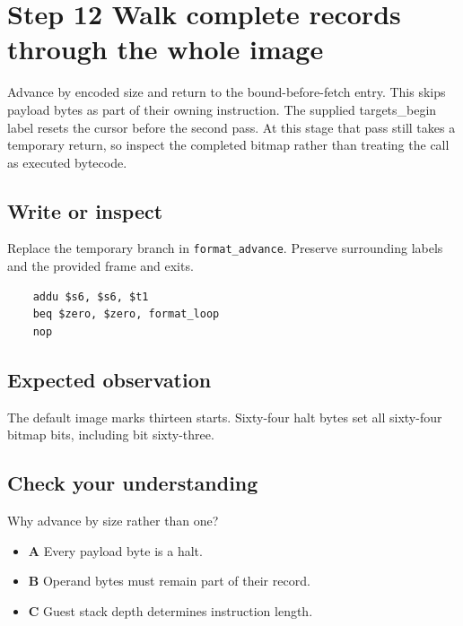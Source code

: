 \section{Step 12 Walk complete records through the whole image}\label{vm-s12}

Advance by encoded size and return to the bound-before-fetch entry. This skips payload bytes as part of their owning instruction. The supplied targets\_begin label resets the cursor before the second pass. At this stage that pass still takes a temporary return, so inspect the completed bitmap rather than treating the call as executed bytecode.

\subsection{Write or inspect}
Replace the temporary branch in \texttt{format\_advance}. Preserve surrounding labels and the provided frame and exits.

\begin{verbatim}
    addu $s6, $s6, $t1
    beq $zero, $zero, format_loop
    nop
\end{verbatim}
\subsection{Expected observation}
The default image marks thirteen starts. Sixty-four halt bytes set all sixty-four bitmap bits, including bit sixty-three.

\subsection{Check your understanding}
Why advance by size rather than one?

\begin{itemize}
  \item \textbf{A} Every payload byte is a halt.
  \item \textbf{B} Operand bytes must remain part of their record.
  \item \textbf{C} Guest stack depth determines instruction length.
\end{itemize}
